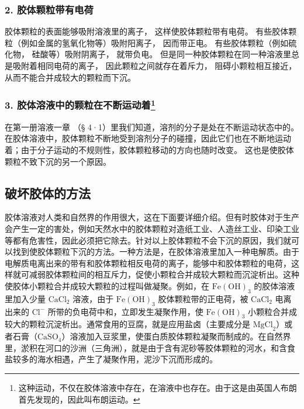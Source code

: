 \subsubsection{2. 胶体颗粒带有电荷}

胶体颗粒的表面能够吸附溶液里的离子， 这样使胶体颗粒带有电荷。
有些胶体颗粒（例如金属的氢氧化物等）吸附阳离子， 因而带正电。
有些胶体颗粒（例如硫化物， 硅酸等）吸附阴离子， 就带负电。
但是同一种胶体颗粒在同一种溶液里总是吸附着相同电荷的离子，
因此颗粒之间就存在着斥力， 阻碍小颗粒相互接近，
从而不能合并成较大的颗粒而下沉。

\subsubsection[3. 胶体溶液中的颗粒在不断运动着]{\texorpdfstring{3.
胶体溶液中的颗粒在不断运动着\footnote{这种运动，不仅在胶体溶液中存在，在溶液中也存在。由于这是由英国人布朗首先发现的，因此叫布朗运动。}}{3. 胶体溶液中的颗粒在不断运动着}}

在第一册溶液一章 （§ 4·1）里我们知道，溶剂的分子是处在不断运动状态中的。
在胶体溶液中，胶体颗粒不断地受到溶剂分子的碰撞，因此它们也在不断地运动着；由于分子运动的不规则性，胶体颗粒移动的方向也随时改变。
这也是使胶体颗粒不致下沉的另一个原因。

\subsection{破坏胶体的方法}

胶体溶液对人类和自然界的作用很大，这在下面要详细介绍。但有时胶体对于生产会产生一定的害处，例如天然水中的胶体颗粒对造纸工业、人造丝工业、印染工业等都有危害性，因此必须把它除去。针对以上胶体颗粒不会下沉的原因，我们就可以找到使胶体颗粒下沉的方法。一种方法是，在胶体溶液里加入一种电解质。由于电解质电离出来的带有和胶体颗粒相反电荷的离子，能够中和胶体颗粒的电荷，这样就可减弱胶体颗粒间的相互斥力，促使小颗粒合并成较大颗粒而沉淀析出。这种使胶体小颗粒合并成较大颗粒的过程叫做凝聚。例如，在
\(\mathrm{Fe(OH)}_3\) 的胶体溶液里加入少量 \(\mathrm{CaCl}_2\)
溶液，由于 \(\mathrm{Fe(OH)}_3\) 胶体颗粒带的正电荷，被
\(\mathrm{CaCl}_2\) 电离出来的 \(\mathrm{Cl^-}\)
所带的负电荷中和，立即发生凝聚作用，使 \(\mathrm{Fe(OH)}_3\)
小颗粒合并成较大的颗粒沉淀析出。通常食用的豆腐，就是应用盐卤（主要成分是
\(\mathrm{MgCl}_2\)）或者石膏（\(\mathrm{CaSO}_4\)）溶液加入豆浆里，使蛋白质胶体颗粒凝聚而制成的。在自然界里，淤积在河口的沙洲（三角洲），就是由于含有泥砂等胶体颗粒的河水，和含食盐较多的海水相遇，产生了凝聚作用，泥沙下沉而形成的。

